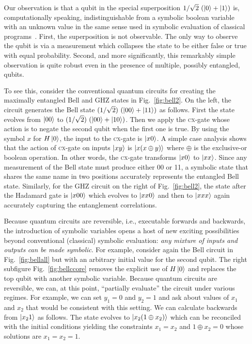 \documentclass[sigplan,screen]{acmart}
\newcommand{\cx}{\textsc{cx}}
\theoremstyle{definition}
\begin{document}
Our observation is that a qubit in the special superposition
$1/\sqrt{2} ~(\ket{0} + \ket{1} )$ is, computationally speaking,
indistinguishable from a symbolic boolean variable with an unknown
value in the same sense used in symbolic evaluation of classical
programs~\cite{10.1145/390016.808445,10.1145/360248.360252,howden,10.1145/800191.805647,10.1145/3182657}.
First, the superposition is not observable. The only way to
observe the qubit is via a measurement which collapses the state to be
either false or true with equal probability. Second, and more
significantly, this remarkably simple observation is quite robust even
in the presence of multiple, possibly entangled, qubits.

To see this, consider the conventional quantum circuits for creating
the maximally entangled Bell and GHZ states in
Fig.~\ref{fig:bell2}. On the left, the circuit generates the Bell
state $(1/\sqrt{2})~ (\ket{00} + \ket{11})$ as follows. First the state
evolves from $\ket{00}$ to $(1/\sqrt{2})~ (\ket{00} + \ket{10})$. Then
we apply the \cx-gate whose action is to negate the second qubit when
the first one is true. By using the symbol $x$ for $H\ket{0}$, the
input to the \cx-gate is $\ket{x0}$. A simple case analysis shows that
the action of \cx-gate on inputs $\ket{xy}$ is $\ket{x(x \oplus y)}$
where $\oplus$ is the exclusive-or boolean operation. In other words,
the \cx-gate transforms $\ket{x0}$ to $\ket{xx}$. Since any
measurement of the Bell state must produce either 00 or 11,
a symbolic state that shares the same name in two positions
accurately represents the entangled Bell state. Similarly,
for the GHZ circuit on the right of Fig.~\ref{fig:bell2}, the state
after the Hadamard gate is $\ket{x00}$ which evolves to $\ket{xx0}$
and then to $\ket{xxx}$ again accurately capturing the entanglement
correlations.

Because quantum circuits are reversible, i.e., executable forwards
and backwards, the introduction of symbolic variables opens a host of
new exciting possibilities beyond conventional (classical) symbolic
evaluation: \emph{any mixture of inputs and outputs can be made
  symbolic}. For example, consider again the Bell circuit in
Fig.~\ref{fig:bellall} but with an arbitrary initial value for the second
qubit. The right subfigure Fig.~\ref{fig:bellccore} removes the
explicit use of $H\ket{0}$ and replaces the top qubit with another
symbolic variable. Because quantum circuits are reversible, we can, at
this point, ``partially evaluate'' the circuit under various
regimes. For example, we can set $y_1=0$ and $y_2=1$ and ask about
values of $x_1$ and $x_2$ that would be consistent with this
setting. We can calculate backwards from $\ket{x_21}$ as follows. The
state evolves to $\ket{x_2(1 \oplus x_2)}$ which can be reconciled
with the initial conditions yielding the constraints $x_1=x_2$ and
$1 \oplus x_2 = 0$ whose solutions are $x_1 = x_2 = 1$.
\end{document}
